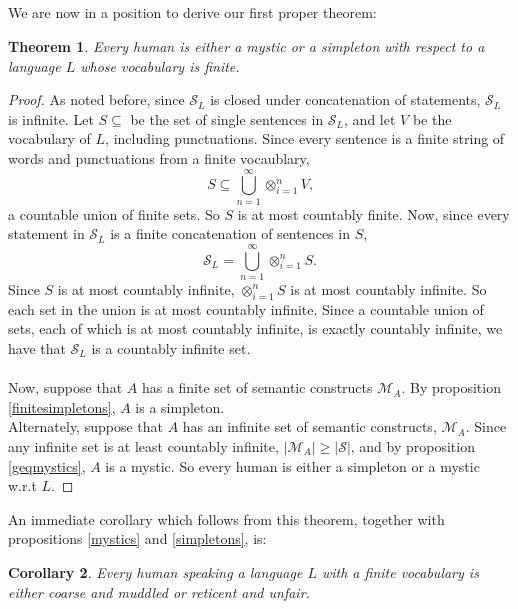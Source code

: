\documentclass[12pt]{article}
\newtheorem{thm}{Theorem}[section]
\newtheorem{cor}[thm]{Corollary}
\begin{document}
\subsection*{} We are now in a position to derive our first proper theorem:
\begin{thm}\label{everyone}
Every human is either a mystic or a simpleton with respect to a language $L$ whose vocabulary is finite.
\end{thm}
\begin{proof}
As noted before, since $\mathcal{S}_L$ is closed under concatenation of statements, $\mathcal{S}_L$ is infinite.  Let $S\subseteq$ be the set of single sentences in $\mathcal{S}_L$, and let $V$ be the vocabulary of $L$, including punctuations.  Since every sentence is a finite string of words and punctuations from a finite vocaublary, \[S\subseteq\bigcup_{n=1}^{\infty}\otimes_{i=1}^{n}{V}\text{,}\]
a countable union of finite sets.  So $S$ is at most countably finite.  Now, since every statement in $\mathcal{S}_L$ is a finite concatenation of sentences in $S$, \[\mathcal{S}_L=\bigcup_{n=1}^{\infty}\otimes_{i=1}^{n}{S}\text{.}\] 
Since $S$ is at most countably infinite, $\otimes_{i=1}^{n}{S}$ is at most countably infinite.  So each set in the union is at most countably infinite.  Since a countable union of sets, each of which is at most countably infinite, is exactly countably infinite, we have that $\mathcal{S}_L$ is a countably infinite set.
\paragraph*{}
Now, suppose that $A$ has a finite set of semantic constructs $\mathcal{M}_A$.  By proposition \ref{finitesimpletons}, $A$ is a simpleton.\\
Alternately, suppose that $A$ has an infinite set of semantic constructs, $\mathcal{M}_A$.  Since any infinite set is at least countably infinite, $|\mathcal{M}_A|\geq|\mathcal{S}|$, and by proposition \ref{geqmystics}, $A$ is a mystic.  So every human is either a simpleton or a mystic w.r.t $L$.
\end{proof}
An immediate corollary which follows from this theorem, together with propositions \ref{mystics} and \ref{simpletons}, is:
\begin{cor}
Every human speaking a language $L$ with a finite vocabulary is either coarse and muddled or reticent and unfair.
\end{cor}
\end{document}
